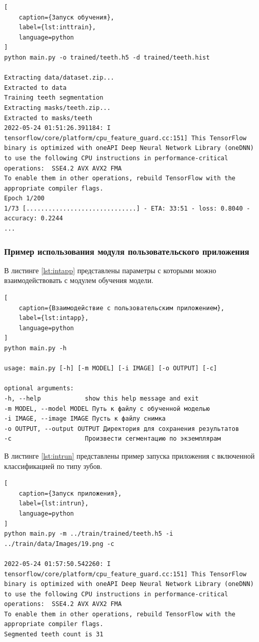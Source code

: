 \begin{lstlisting}[
	caption={Запуск обучения},
	label={lst:inttrain},
	language=python
]
python main.py -o trained/teeth.h5 -d trained/teeth.hist

Extracting data/dataset.zip...
Extracted to data
Training teeth segmentation
Extracting masks/teeth.zip...
Extracted to masks/teeth
2022-05-24 01:51:26.391184: I tensorflow/core/platform/cpu_feature_guard.cc:151] This TensorFlow binary is optimized with oneAPI Deep Neural Network Library (oneDNN) to use the following CPU instructions in performance-critical operations:  SSE4.2 AVX AVX2 FMA
To enable them in other operations, rebuild TensorFlow with the appropriate compiler flags.
Epoch 1/200
1/73 [..............................] - ETA: 33:51 - loss: 0.8040 - accuracy: 0.2244
...
\end{lstlisting}

\subsubsection{Пример использования модуля пользовательского приложения}

В листинге \ref{lst:intapp} представлены параметры с которыми можно взаимодействовать с модулем обучения модели.

\begin{lstlisting}[
	caption={Взаимодействие с пользовательским приложением},
	label={lst:intapp},
	language=python
]
python main.py -h

usage: main.py [-h] [-m MODEL] [-i IMAGE] [-o OUTPUT] [-c]

optional arguments:
-h, --help            show this help message and exit
-m MODEL, --model MODEL Путь к файлу с обученной моделью
-i IMAGE, --image IMAGE Пусть к файлу снимка
-o OUTPUT, --output OUTPUT Директория для сохранения результатов
-c                    Произвести сегментацию по экземплярам
\end{lstlisting}

В листинге \ref{lst:intrun} представлены пример запуска приложения с включенной классификацией по типу зубов.

\begin{lstlisting}[
	caption={Запуск приложения},
	label={lst:intrun},
	language=python
]
python main.py -m ../train/trained/teeth.h5 -i ../train/data/Images/19.png -c

2022-05-24 01:57:50.542260: I tensorflow/core/platform/cpu_feature_guard.cc:151] This TensorFlow binary is optimized with oneAPI Deep Neural Network Library (oneDNN) to use the following CPU instructions in performance-critical operations:  SSE4.2 AVX AVX2 FMA
To enable them in other operations, rebuild TensorFlow with the appropriate compiler flags.
Segmented teeth count is 31
\end{lstlisting}

